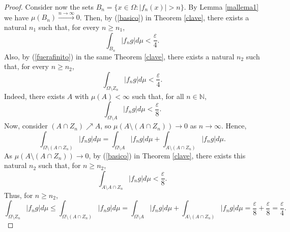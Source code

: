 \documentclass[11pt,a4paper]{amsart}
\newcommand\boldred[1]{\textcolor{red}{\textbf{#1}}}
\begin{document}
\begin{proof}
    Consider now the sets $B_n=\{x\in\Omega:\vert f_n(x)\vert>n\}$. 
    By Lemma \ref{mallema1} we have $\mu(B_n)\xrightarrow{n\rightarrow\infty}0$.
    Then, by (\ref{basico}) in Theorem \ref{clave}, there exists a natural $n_1$ such that, for every $n\geq n_1$,
    $$
    \int _{B_n}\vert f_n g\vert d\mu <\frac{\varepsilon}{4}.
    $$
    Also, by (\ref{fuerafinito}) in the same Theorem \ref{clave}, there exists a natural $n_2$ such that, for every $n\geq n_2$,
    $$
    \int _{\Omega\setminus Z_n}\vert f_n g\vert d\mu <\frac{\varepsilon}{4}.
    $$
    Indeed, there exists $A$ with $\mu(A)<\infty$ such that, for all $n\in\mathbb{N}$,
    $$
    \int_{\Omega\setminus A} \vert f_n g \vert d\mu<\frac{\varepsilon}{8}.
    $$
    Now, consider $(A\cap Z_n)\nearrow A$, so $\mu(A\setminus(A\cap Z_n))\rightarrow 0$ as $n\rightarrow\infty$. Hence,
    $$
    \int_{\Omega\setminus(A\cap Z_n)} \vert f_n g\vert d\mu
    =\int_{\Omega\setminus A} \vert f_n g\vert d \mu + \int_{A\setminus(A\cap Z_n)} \vert f_n g \vert d\mu.
    $$
    As $\mu(A\setminus(A\cap Z_n))\rightarrow 0$, by (\ref{basico}) in Theorem \ref{clave}, there exists this natural $n_2$ such that, for $n\geq n_2$,
    $$
    \int_{A\setminus A\cap Z_n} \vert f_n g\vert d\mu <\frac{\varepsilon}{8}.
    $$
    Thus, for $n\geq n_2$,
    $$
    \int_{\Omega\setminus Z_n} \vert f_n g\vert d\mu
    \leq \int_{\Omega\setminus (A\cap Z_n)} \vert f_n g\vert d\mu
    =\int_{\Omega\setminus A} \vert f_n g\vert d \mu + \int_{A\setminus(A\cap Z_n)} \vert f_n g \vert d\mu
    =\frac{\varepsilon}{8}+\frac{\varepsilon}{8}=\frac{\varepsilon}{4}.
    $$


\end{proof}
\end{document}
